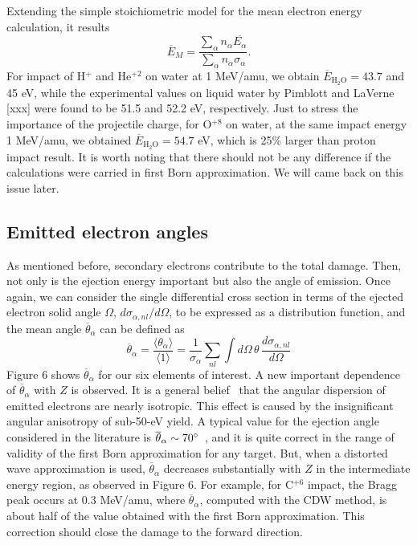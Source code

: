 \documentclass[preprint,12pt]{article}
\begin{document}
Extending the simple stoichiometric model for the mean electron energy
calculation, it results
\begin{equation}
\overline{E}_{M}=\frac{\sum\limits_{\alpha}n_{\alpha}
\overline{E_{\alpha}}}{\sum\limits_{\alpha}n_{\alpha}\sigma_{\alpha}}.
\label{70}
\end{equation}
For impact of H$^{+}$ and He$^{+2}$ on water at 1 MeV/amu, we obtain 
$\overline{E}_{\text{H}_{2}\text{O}}=43.7$ and 45 eV, while the 
experimental values 
on liquid water by Pimblott and LaVerne [xxx] were found to be 51.5 and 
52.2 eV, respectively. Just to stress the importance of the projectile 
charge, for O$^{+8}$ on water, at the same impact energy 1 MeV/amu, 
we obtained $\overline{E}_{\text{H}_{2}\text{O}}=54.7$ eV, which is 25\% 
larger than proton impact result. It is worth noting that there should 
not be any difference if the calculations were carried in first Born 
approximation. We will came back on this issue later.

\subsection{Emitted electron angles}

As mentioned before, secondary electrons contribute to the total damage. 
Then, not only is the ejection energy important but also the angle 
of emission. Once again, we can consider the single differential cross 
section in terms of the ejected electron solid angle $\Omega$, 
$d\sigma_{\alpha,nl}/d\Omega$, to be expressed as a distribution function, 
and the mean angle $\overline{\theta}_{\alpha}$ can be defined as
\begin{equation}
\overline{\theta}_{\alpha}=\frac{\langle\theta_{\alpha}\rangle}
{\langle 1\rangle}=\frac{1}{\sigma_{\alpha}}\sum\limits_{nl}
\int d\Omega\,\theta\,\frac{d\sigma_{\alpha,nl}}{d\Omega}
\end{equation}
Figure 6 shows $\overline{\theta}_{\alpha}$ for our six elements of 
interest. A new important dependence of $\overline{\theta}_{\alpha}$ 
with $Z$ is observed. It is a general belief~\cite{Rudd1992} that the 
angular dispersion of emitted electrons are nearly isotropic. This effect 
is caused by the insignificant angular anisotropy of sub-50-eV yield. 
A typical value for the ejection angle considered in the literature is 
$\overline{\theta}_{\alpha}\sim 70\degree$~\cite{surdutovic2018}, and 
it is quite correct in the range of validity of the first Born 
approximation for any target. But, when a distorted wave approximation 
is used, $\overline{\theta}_{\alpha}$ decreases substantially with $Z$ 
in the intermediate energy region, as observed in Figure 6. 
For example, for C$^{+6}$ impact, the Bragg peak occurs at 0.3 MeV/amu, 
where $\overline{\theta}_{\alpha}$, computed with the CDW method, is 
about half of the value obtained with the first Born approximation. 
This correction should close the damage to the forward direction.
\end{document}
